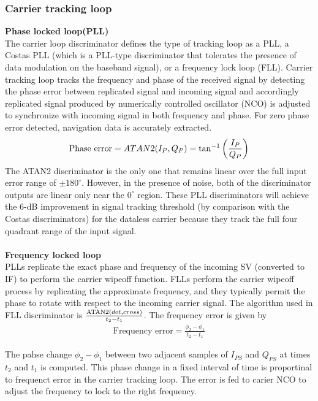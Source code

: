 \subsubsection{Carrier tracking loop}
\textbf{Phase locked loop(PLL)}\\
The carrier loop discriminator defines the type of tracking loop as a PLL, a Costas PLL (which is a PLL-type discriminator that tolerates the presence of data modulation on the baseband signal), or a frequency lock loop (FLL). Carrier tracking loop tracks the frequency and phase of the received signal by detecting the phase error between replicated signal and incoming signal and accordingly replicated signal produced by numerically controlled oscillator (NCO) is adjusted to synchronize with incoming signal in both frequency and phase. For zero phase error detected, navigation data is accurately extracted. 
\begin{align}
  \text{Phase error} =ATAN2(I_P,Q_P) = \tan^{-1}\left(\frac{I_P}{Q_P}\right)
\end{align}
The ATAN2 discriminator is the only one that remains linear over the full input error range of $\pm180^{\circ}$. However, in the presence of noise, both of the discriminator outputs are linear only near the $0^{\circ}$ region. These PLL discriminators will achieve the 6-dB improvement in signal tracking threshold (by comparison with the Costas discriminators) for the dataless carrier because they track the full four quadrant range of the input signal.
\\
\\
\textbf{Frequency locked loop}\\
PLLs replicate the exact phase and frequency of the incoming SV (converted to IF) to perform the carrier wipeoff function. FLLs perform the carrier wipeoff process by replicating the approximate frequency, and they typically permit the phase to rotate with respect to the incoming carrier signal. The algorithm used in FLL discriminator is $\frac{\text{ATAN2}{\ensuremath{\left(dot,cross\right)}}}{t_2-t_1}$. The frequency error is given by 
\begin{align}
	\text{Frequency error} = \frac{\phi_2-\phi_1}{t_2-t_1}
\end{align}

\noindent The pahse change $\phi_2 - \phi_1$ between two adjacent samples of $I_{PS}$ and $Q_{PS}$ at times $t_2$ and $t_1$ is computed. This phase change in a fixed interval of time is proportinal to frequenct error in the carrier tracking loop. The error is fed to carier NCO to adjust the frequency to lock to the right frequency.

